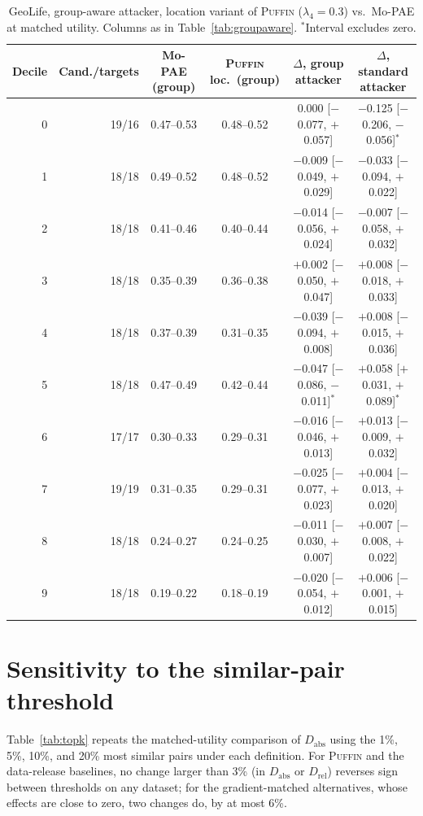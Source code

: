 \documentclass[sigconf,anonymous,review]{acmart}
\newcommand{\puffin}{\textsc{Puffin}}
\begin{document}
\begin{table}[!htbp]
\centering
\caption{GeoLife, group-aware attacker, location variant of \puffin{} ($\lambda_4=0.3$) vs.\ Mo-PAE at matched utility. Columns as in Table~\ref{tab:groupaware}. $^*$Interval excludes zero.}
\label{tab:groupaware-loc}
\scriptsize
\begin{tabular}{@{}rrcccc@{}}
\toprule
Decile & Cand./targets & Mo-PAE (group) & \puffin{} loc.\ (group) & $\Delta$, group attacker & $\Delta$, standard attacker \\
\midrule
0 & 19/16 & 0.47--0.53 & 0.48--0.52 & 0.000 [$-$0.077, $+$0.057] & $-$0.125 [$-$0.206, $-$0.056]$^*$ \\
1 & 18/18 & 0.49--0.52 & 0.48--0.52 & $-$0.009 [$-$0.049, $+$0.029] & $-$0.033 [$-$0.094, $+$0.022] \\
2 & 18/18 & 0.41--0.46 & 0.40--0.44 & $-$0.014 [$-$0.056, $+$0.024] & $-$0.007 [$-$0.058, $+$0.032] \\
3 & 18/18 & 0.35--0.39 & 0.36--0.38 & $+$0.002 [$-$0.050, $+$0.047] & $+$0.008 [$-$0.018, $+$0.033] \\
4 & 18/18 & 0.37--0.39 & 0.31--0.35 & $-$0.039 [$-$0.094, $+$0.008] & $+$0.008 [$-$0.015, $+$0.036] \\
5 & 18/18 & 0.47--0.49 & 0.42--0.44 & $-$0.047 [$-$0.086, $-$0.011]$^*$ & $+$0.058 [$+$0.031, $+$0.089]$^*$ \\
6 & 17/17 & 0.30--0.33 & 0.29--0.31 & $-$0.016 [$-$0.046, $+$0.013] & $+$0.013 [$-$0.009, $+$0.032] \\
7 & 19/19 & 0.31--0.35 & 0.29--0.31 & $-$0.025 [$-$0.077, $+$0.023] & $+$0.004 [$-$0.013, $+$0.020] \\
8 & 18/18 & 0.24--0.27 & 0.24--0.25 & $-$0.011 [$-$0.030, $+$0.007] & $+$0.007 [$-$0.008, $+$0.022] \\
9 & 18/18 & 0.19--0.22 & 0.18--0.19 & $-$0.020 [$-$0.054, $+$0.012] & $+$0.006 [$-$0.001, $+$0.015] \\
\bottomrule
\end{tabular}
\end{table}


\section{Sensitivity to the similar-pair threshold}
\label{app:topk}
Table~\ref{tab:topk} repeats the matched-utility comparison of $D_{\mathrm{abs}}$ using the 1\%, 5\%, 10\%, and 20\% most similar pairs under each definition. For \puffin{} and the data-release baselines, no change larger than 3\% (in $D_{\mathrm{abs}}$ or $D_{\mathrm{rel}}$) reverses sign between thresholds on any dataset; for the gradient-matched alternatives, whose effects are close to zero, two changes do, by at most 6\%.
\end{document}
